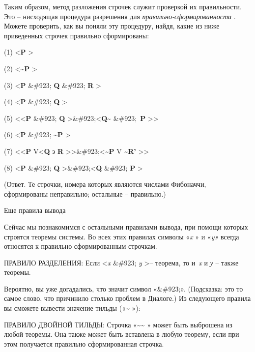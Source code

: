 \documentclass[../main.tex]{subfiles}
\begin{document}
Таким образом, метод разложения строчек служит проверкой их правильности. Это \--- нисходящая процедура разрешения для \emph{правильно-сформированности} . Можете проверить, как вы поняли эту процедуру, найдя, какие из ниже приведенных строчек правильно сформированы:

(1) \textless{}\textbf{P} \textgreater{}

(2) \textless{}\textbf{\textasciitilde P} \textgreater{}

(3) \textless{}\textbf{P} \&\#923; \textbf{Q} \&\#923; \textbf{R} \textgreater{}

(4) \textless{}\textbf{P} \&\#923; \textbf{Q} \textgreater{}

(5) \textless\textless{}\textbf{P} \&\#923; \textbf{Q} \textgreater\&\#923;\textless{}\textbf{Q\textasciitilde{}} \&\#923;~\textbf{P} \textgreater\textgreater{}

(6) \textless{}\textbf{P} \&\#923; \textbf{\textasciitilde P} \textgreater{}

(7) \textless\textless{}\textbf{P} V\textless{}\textbf{Q} э \textbf{R} \textgreater\textgreater\&\#923;\textless{}\textbf{\textasciitilde P} V \textbf{\textasciitilde R'} \textgreater\textgreater{}

(8) \textless{}\textbf{P} \&\#923; \textbf{Q} \textgreater\&\#923;\textless{}\textbf{Q} \&\#923; \textbf{P} \textgreater{}

(Ответ. Те строчки, номера которых являются числами Фибоначчи, сформированы неправильно; остальные \--- правильно.)

Еще правила вывода

Сейчас мы познакомимся с остальными правилами вывода, при помощи которых строятся теоремы системы. Во всех этих правилах символы «\emph{x} » и «\emph{y»} всегда относятся к правильно сформированным строчкам.

ПРАВИЛО РАЗДЕЛЕНИЯ: Если \textless{}\emph{x} \&\#923; \emph{y} \textgreater \--- теорема, то и~\emph{x} и \emph{у} \--- также теоремы.

Вероятно, вы уже догадались, что значит символ «\&\#923;». (Подсказка: это то самое слово, что причинило столько проблем в Диалоге.) Из следующего правила вы сможете вывести значение тильды («\textbf{\textasciitilde{}} »):

ПРАВИЛО ДВОЙНОЙ ТИЛЬДЫ: Строчка «\textbf{\textasciitilde\textasciitilde{}} » может быть выброшена из любой теоремы. Она также может быть вставлена в любую теорему, если при этом получается правильно сформированная строчка.
\end{document}
